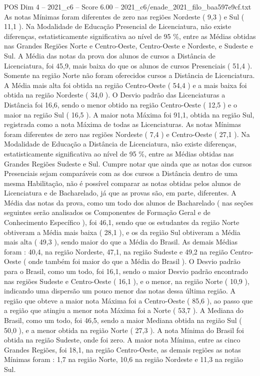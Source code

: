 \begin{textsample}{POS Dim 4 – 2021\_c6 – Score 6.00 – 2021\_c6/enade\_2021\_filo\_baa597e9cf.txt}
As notas Mínimas foram diferentes de zero nas regiões Nordeste ( 9,3 ) e Sul ( 11,1 ).
Na Modalidade de Educação Presencial de Licenciatura, não existe diferenças, estatisticamente significativa ao nível de 95 \%, entre as Médias obtidas nas Grandes Regiões Norte e Centro-Oeste, Centro-Oeste e Nordeste, e Sudeste e Sul.
A Média das notas da prova dos alunos de cursos a Distância de Licenciatura, foi 45,9, mais baixa do que os alunos de cursos Presenciais ( 51,4 ).
Somente na região Norte não foram oferecidos cursos a Distância de Licenciatura.
A Média mais alta foi obtida na região Centro-Oeste ( 54,4 ) e a mais baixa foi obtida na região Nordeste ( 34,0 ).
O Desvio padrão das Licenciaturas a Distância foi 16,6, sendo o menor obtido na região Centro-Oeste ( 12,5 ) e o maior na região Sul ( 16,5 ).
A maior nota Máxima foi 91,1, obtida na região Sul, registrada como a nota Máxima de todas as Licenciaturas.
As notas Mínimas foram diferentes de zero nas regiões Nordeste ( 7,4 ) e Centro-Oeste ( 27,1 ).
Na Modalidade de Educação a Distância de Licenciatura, não existe diferenças, estatisticamente significativa ao nível de 95 \%, entre as Médias obtidas nas Grandes Regiões Sudeste e Sul.
Cumpre notar que ainda que as notas dos cursos Presenciais sejam comparáveis com as dos cursos a Distância dentro de uma mesma Habilitação, não é possível comparar as notas obtidas pelos alunos de Licenciatura e de Bacharelado, já que as provas são, em parte, diferentes.
A Média das notas da prova, como um todo dos alunos de Bacharelado ( nas seções seguintes serão analisados os Componentes de Formação Geral e de Conhecimento Específico ), foi 46,1, sendo que os estudantes da região Norte obtiveram a Média mais baixa ( 28,1 ), e os da região Sul obtiveram a Média mais alta ( 49,3 ), sendo maior do que a Média do Brasil.
As demais Médias foram : 40,4, na região Nordeste, 47,1, na região Sudeste e 49,2 na região Centro-Oeste ( onde também foi maior do que a Média do Brasil ).
O Desvio padrão para o Brasil, como um todo, foi 16,1, sendo o maior Desvio padrão encontrado nas regiões Sudeste e Centro-Oeste ( 16,1 ), e o menor, na região Norte ( 10,9 ), indicando uma dispersão um pouco menor das notas dessa última região.
A região que obteve a maior nota Máxima foi a Centro-Oeste ( 85,6 ), ao passo que a região que atingiu a menor nota Máxima foi a Norte ( 53,7 ).
A Mediana do Brasil, como um todo, foi 46,5, sendo a maior Mediana obtida na região Sul ( 50,0 ), e a menor obtida na região Norte ( 27,3 ).
A nota Mínima do Brasil foi obtida na região Sudeste, onde foi zero.
A maior nota Mínima, entre as cinco Grandes Regiões, foi 18,1, na região Centro-Oeste, as demais regiões as notas Mínimas foram : 1,7 na região Norte, 10,6 na região Nordeste e 11,3 na região Sul.

\end{textsample}
